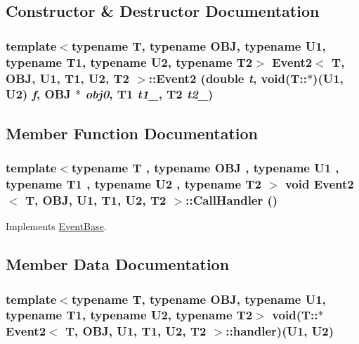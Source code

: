 \subsection{Constructor \& Destructor Documentation}
\hypertarget{classEvent2_ba7c624909641184917f7a5603ab2ebe}{
\subsubsection[{Event2}]{\setlength{\rightskip}{0pt plus 5cm}template$<$typename T, typename OBJ, typename U1, typename T1, typename U2, typename T2$>$ {\bf Event2}$<$ T, OBJ, U1, T1, U2, T2 $>$::{\bf Event2} (double {\em t}, \/  void(T::$\ast$)(U1, U2) {\em f}, \/  OBJ $\ast$ {\em obj0}, \/  T1 {\em t1\_}, \/  T2 {\em t2\_})}}
\label{classEvent2_ba7c624909641184917f7a5603ab2ebe}




\subsection{Member Function Documentation}
\hypertarget{classEvent2_428b314837eee680fa435cad61944af3}{
\subsubsection[{CallHandler}]{\setlength{\rightskip}{0pt plus 5cm}template$<$typename T , typename OBJ , typename U1 , typename T1 , typename U2 , typename T2 $>$ void {\bf Event2}$<$ T, OBJ, U1, T1, U2, T2 $>$::CallHandler ()}}
\label{classEvent2_428b314837eee680fa435cad61944af3}




Implements \hyperlink{classEventBase_121ca64dec88c8d9589c064b0060d037}{EventBase}.

\subsection{Member Data Documentation}
\hypertarget{classEvent2_166c37cb53b2969dac38fa79b0349768}{
\subsubsection[{handler}]{\setlength{\rightskip}{0pt plus 5cm}template$<$typename T, typename OBJ, typename U1, typename T1, typename U2, typename T2$>$ void(T::$\ast$ {\bf Event2}$<$ T, OBJ, U1, T1, U2, T2 $>$::{\bf handler})(U1, U2)}}
\label{classEvent2_166c37cb53b2969dac38fa79b0349768}


